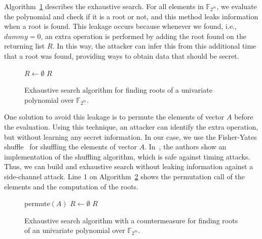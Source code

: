 Algorithm~\ref{alg:exhaustive} describes the exhaustive search. For all elements in $\mathbb{F}_{2^m}$, we evaluate the polynomial and check if it is a root or not, and this method leaks information when a root is found. This leakage occurs because whenever we found, i.e., $dummy = 0$, an extra operation is performed by adding the root found on the returning list $R$. In this way, the attacker can infer this from this additional time that a root was found, providing ways to obtain data that should be secret.

\begin{figure}[ht]
\begin{algorithm}[H]
 $R \gets \emptyset$\;
\Return $R$\;
  \caption{Exhaustive search algorithm for finding roots of a univariate polynomial over $\mathbb{F}_{2^m}$.}\label{alg:exhaustive}
\end{algorithm}
\end{figure}

One solution to avoid this leakage is to permute the elements of vector $A$ before the evaluation. Using this technique, an attacker can identify the extra operation, but without learning any secret information. In our case, we use the Fisher-Yates shuffle~\cite{black2005fisher} for shuffling the elements of vector $A$. In~\cite{wang2018fpga}, the authors show an implementation of the shuffling algorithm, which is safe against timing attacks. Thus, we can build and exhaustive search without leaking information against a side-channel attack. Line 1 on Algorithm~\ref{alg:exhaustive_permuted} shows the permutation call of the elements and the computation of the roots.

\begin{figure}[ht]
\begin{algorithm}[H]
  permute$(A)$\;
 $R \gets \emptyset$\;
\Return $R$\;
 \caption{Exhaustive search algorithm with a countermeasure for finding roots of an univariate polynomial over $\mathbb{F}_{2^m}$.}
  \label{alg:exhaustive_permuted}
\end{algorithm}
\end{figure}

